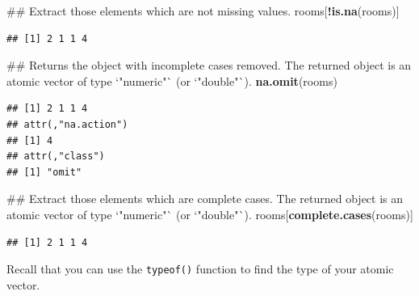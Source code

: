 \documentclass[]{book}
\newenvironment{Shaded}{\begin{snugshade}}{\end{snugshade}}
\newcommand{\KeywordTok}[1]{\textcolor[rgb]{0.13,0.29,0.53}{\textbf{#1}}}
\newcommand{\OperatorTok}[1]{\textcolor[rgb]{0.81,0.36,0.00}{\textbf{#1}}}
\newcommand{\NormalTok}[1]{#1}
\begin{document}
\begin{Shaded}
\begin{Highlighting}[]
\NormalTok{## Extract those elements which are not missing values.}
\NormalTok{rooms[}\OperatorTok{!}\KeywordTok{is.na}\NormalTok{(rooms)]}
\end{Highlighting}
\end{Shaded}

\begin{verbatim}
## [1] 2 1 1 4
\end{verbatim}

\begin{Shaded}
\begin{Highlighting}[]
\NormalTok{## Returns the object with incomplete cases removed. The returned object is an atomic vector of type `"numeric"` (or `"double"`).}
\KeywordTok{na.omit}\NormalTok{(rooms)}
\end{Highlighting}
\end{Shaded}

\begin{verbatim}
## [1] 2 1 1 4
## attr(,"na.action")
## [1] 4
## attr(,"class")
## [1] "omit"
\end{verbatim}

\begin{Shaded}
\begin{Highlighting}[]
\NormalTok{## Extract those elements which are complete cases. The returned object is an atomic vector of type `"numeric"` (or `"double"`).}
\NormalTok{rooms[}\KeywordTok{complete.cases}\NormalTok{(rooms)]}
\end{Highlighting}
\end{Shaded}

\begin{verbatim}
## [1] 2 1 1 4
\end{verbatim}

Recall that you can use the \texttt{typeof()} function to find the type
of your atomic vector.
\end{document}

